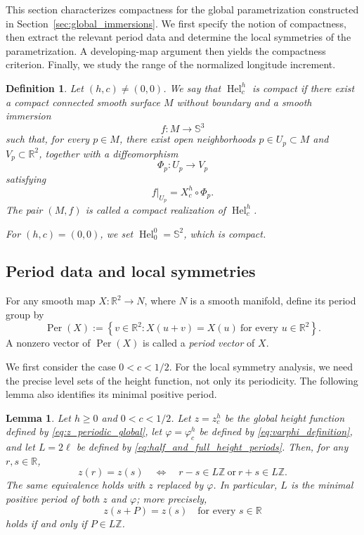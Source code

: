 \documentclass[a4paper,11pt]{amsart}
\numberwithin{equation}{section}
\theoremstyle{plain}
\newtheorem{lem}[thm]{Lemma}
\newtheorem{defn}[thm]{Definition}
\begin{document}
This section characterizes compactness for the global parametrization
constructed in Section~\ref{sec:global_immersions}. We first specify the
notion of compactness, then extract the relevant period
data and determine the local symmetries of the parametrization. A
developing-map argument then yields the compactness criterion. Finally, we
study the range of the normalized longitude increment.

\begin{defn}\label{def:compactness}
Let $(h,c)\neq(0,0)$. We say that
$\operatorname{Hel}_c^h$ is \emph{compact} if there exist a compact
connected smooth surface $M$ without boundary and a smooth immersion
\[
f:M\longrightarrow\mathbb S^3
\]
such that, for every $p\in M$, there exist open neighborhoods
$p\in U_p\subset M$ and $V_p\subset\mathbb R^2$, together with a
diffeomorphism
\[
\Phi_p:U_p\longrightarrow V_p
\]
satisfying
\[
f|_{U_p}=X_c^h\circ\Phi_p.
\]
The pair $(M,f)$ is called a \emph{compact realization} of
$\operatorname{Hel}_c^h$.

For $(h,c)=(0,0)$, we set
$\operatorname{Hel}_0^0=\mathbb S^2$, which is compact.
\end{defn}

\subsection{Period data and local symmetries}

For any smooth map $X:\mathbb R^2\to N$, where $N$ is a smooth
manifold, define its period group by
\begin{equation}\label{eq:translation_period_definition_general}
\operatorname{Per}(X)
:=
\left\{
 v\in\mathbb R^2:
 X(u+v)=X(u)\ \text{for every }u\in\mathbb R^2
\right\}.
\end{equation}
A nonzero vector of $\operatorname{Per}(X)$ is called a \emph{period vector}
of $X$.

We first consider the case $0<c<1/2$. For the local
symmetry analysis, we need the precise level sets of the height function, not
only its periodicity. The following lemma also identifies its minimal positive
period.

\begin{lem}\label{lem:minimal_height_period}
Let $h\geq0$ and $0<c<1/2$. Let $z=z_c^h$ be the global height function defined
by \eqref{eq:z_periodic_global}, let
$\varphi=\varphi_c^h$ be defined by \eqref{eq:varphi_definition}, and
let $L=2\ell$ be defined by
\eqref{eq:half_and_full_height_periods}. Then, for any
$r,s\in\mathbb R$,
\begin{equation}\label{eq:z_fiber_structure}
z(r)=z(s)
\quad\Longleftrightarrow\quad
r-s\in L\mathbb Z
\ \text{or}\
r+s\in L\mathbb Z.
\end{equation}
The same equivalence holds with $z$ replaced by $\varphi$. In
particular, $L$ is the minimal positive period of both $z$ and
$\varphi$; more precisely,
\[
z(s+P)=z(s)\quad\text{for every }s\in\mathbb R
\]
holds if and only if $P\in L\mathbb Z$.
\end{lem}
\end{document}
